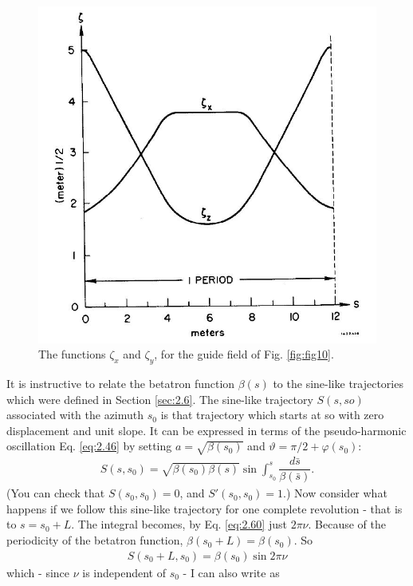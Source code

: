 \begin{figure}[!htb]
	\centering
	\includegraphics[width=0.8\linewidth]{./Figuras/fig18.jpeg}
	\caption{The functions $\zeta_x$ and $\zeta_y$, for the guide field of Fig. \ref{fig:fig10}.}
	\label{fig:fig18}
\end{figure}

It is instructive to relate the betatron function $\beta(s)$ to the sine-like trajectories which were defined in Section \ref{sec:2.6}. The sine-like trajectory $S(s, so)$ associated with the azimuth $s_0$ is that trajectory which starts at so with zero displacement
and unit slope. It can be expressed in terms of the pseudo-harmonic oscillation Eq. \eqref{eq:2.46} by setting $a = \sqrt{\beta(s_0)}$ and $\vartheta = \pi/2+\varphi(s_0)$:
\begin{align}
	S(s,s_0) = \sqrt{\beta(s_0)\beta(s)}\sin\int_{s_0}^s\dfrac{d\bar{s}}{\beta(\bar{s})}.
\end{align}
(You can check that $S(s_0, s_0) = 0$, and $S'(s_0, s_0) = 1$.) Now consider what happens if we follow this sine-like trajectory for one complete revolution - that is to $s = s_0 + L$. The integral becomes, by Eq. \eqref{eq:2.60} just $2\pi\nu$. Because of the periodicity of the betatron function, $\beta(s_0 + L) = \beta(s_0)$. So
\begin{align}
	S(s_0+L,s_0)=\beta(s_0)\sin2\pi\nu
\end{align}
which - since $\nu$ is independent of $s_0$ - I can also write as

